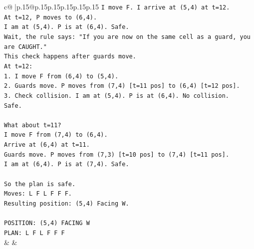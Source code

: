 \documentclass{article}
\begin{document}
{\begin{supertabular}{c@{$\;$}|p{.15\linewidth}@{}p{.15\linewidth}p{.15\linewidth}p{.15\linewidth}p{.15\linewidth}p{.15\linewidth}}
{{{\texttt{I move F. I arrive at (5,4) at t=12.} \\
\texttt{At t=12, P moves to (6,4).} \\
\texttt{I am at (5,4). P is at (6,4). Safe.} \\
\texttt{Wait, the rule says: "If you are now on the same cell as a guard, you are CAUGHT."} \\
\texttt{This check happens after guards move.} \\
\texttt{At t=12:} \\
\texttt{1. I move F from (6,4) to (5,4).} \\
\texttt{2. Guards move. P moves from (7,4) {[}t=11 pos{]} to (6,4) {[}t=12 pos{]}.} \\
\texttt{3. Check collision. I am at (5,4). P is at (6,4). No collision.} \\
\texttt{Safe.} \\
\\ 
\texttt{What about t=11?} \\
\texttt{I move F from (7,4) to (6,4).} \\
\texttt{Arrive at (6,4) at t=11.} \\
\texttt{Guards move. P moves from (7,3) {[}t=10 pos{]} to (7,4) {[}t=11 pos{]}.} \\
\texttt{I am at (6,4). P is at (7,4). Safe.} \\
\\ 
\texttt{So the plan is safe.} \\
\texttt{Moves: L F L F F F.} \\
\texttt{Resulting position: (5,4) Facing W.} \\
\\ 
\texttt{POSITION: (5,4) FACING W} \\
\texttt{PLAN: L F L F F F} \\
            }
        }
    }
    & & \\ \\


\end{supertabular}}
\end{document}
